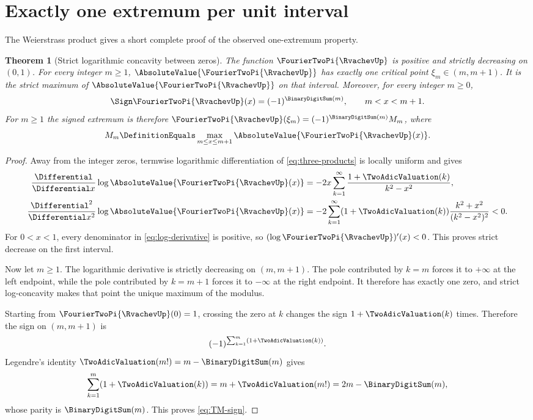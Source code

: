 \documentclass[11pt,oneside]{article}
\numberwithin{equation}{section}
\newtheorem{theorem}{Theorem}[section]
\theoremstyle{definition}
\theoremstyle{remark}
\begin{document}
\section{Exactly one extremum per unit interval}
\label{sec:extrema}

The Weierstrass product gives a short complete proof of the observed one-extremum property.

\begin{theorem}[Strict logarithmic concavity between zeros]
\label{thm:unique-extremum}
The function $\FourierTwoPi{\RvachevUp}$ is positive and strictly decreasing on $(0,1)$.  For every integer
$m\ge1$, $\AbsoluteValue{\FourierTwoPi{\RvachevUp}}$ has exactly one critical point
$\xi_m\in(m,m+1)$.  It is the strict maximum of $\AbsoluteValue{\FourierTwoPi{\RvachevUp}}$ on that interval.  Moreover,
for every integer $m\ge0$,
\begin{equation}
 \Sign\FourierTwoPi{\RvachevUp}(x)=(-1)^{\BinaryDigitSum(m)},\qquad m<x<m+1.
 \label{eq:TM-sign}
\end{equation}
For $m\ge1$ the signed extremum is therefore
$\FourierTwoPi{\RvachevUp}(\xi_m)=(-1)^{\BinaryDigitSum(m)}M_m$, where
\[
 M_m\DefinitionEquals\max_{m\le x\le m+1}\AbsoluteValue{\FourierTwoPi{\RvachevUp}(x)}.
\]
\end{theorem}

\begin{proof}
Away from the integer zeros, termwise logarithmic differentiation of
\eqref{eq:three-products} is locally uniform and gives
\begin{align}
 \frac{\Differential}{\Differential x}\log\AbsoluteValue{\FourierTwoPi{\RvachevUp}(x)}
 &=-2x\sum_{k=1}^{\infty}\frac{1+\TwoAdicValuation(k)}{k^2-x^2},
 \label{eq:log-derivative}\\
 \frac{\Differential^2}{\Differential x^2}\log\AbsoluteValue{\FourierTwoPi{\RvachevUp}(x)}
 &=-2\sum_{k=1}^{\infty}(1+\TwoAdicValuation(k))
   \frac{k^2+x^2}{(k^2-x^2)^2}<0.
 \label{eq:strict-log-concavity}
\end{align}
For $0<x<1$, every denominator in \eqref{eq:log-derivative} is positive, so
$(\log\FourierTwoPi{\RvachevUp})'(x)<0$.  This proves strict decrease on the first interval.

Now let $m\ge1$.  The logarithmic derivative is strictly decreasing on $(m,m+1)$.
The pole contributed by $k=m$ forces it to $+\infty$ at the left endpoint, while the pole
contributed by $k=m+1$ forces it to $-\infty$ at the right endpoint.  It therefore has
exactly one zero, and strict log-concavity makes that point the unique maximum of the modulus.

Starting from $\FourierTwoPi{\RvachevUp}(0)=1$, crossing the zero at $k$ changes the sign
$1+\TwoAdicValuation(k)$ times.  Therefore the sign on $(m,m+1)$ is
\[
 (-1)^{\sum_{k=1}^{m}(1+\TwoAdicValuation(k))}.
\]
Legendre's identity $\TwoAdicValuation(m!)=m-\BinaryDigitSum(m)$ gives
\[
 \sum_{k=1}^{m}(1+\TwoAdicValuation(k))=m+\TwoAdicValuation(m!)=2m-\BinaryDigitSum(m),
\]
whose parity is $\BinaryDigitSum(m)$.  This proves \eqref{eq:TM-sign}.
\end{proof}
\end{document}
